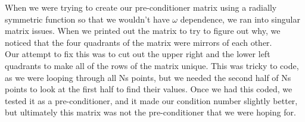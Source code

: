 
When we were trying to create our pre-conditioner matrix using a radially symmetric function so that we wouldn't have $\omega$ dependence, we ran into singular matrix issues. When we printed out the matrix to try to figure out why, we noticed that the four quadrants of the matrix were mirrors of each other. \\
Our attempt to fix this was to cut out the upper right and the lower left quadrants to make all of the rows of the matrix unique. This was tricky to code, as we were looping through all Ns points, but we needed the second half of Ns points to look at the first half to find their values. Once we had this coded, we tested it as a pre-conditioner, and it made our condition number slightly better, but ultimately this matrix was not the pre-conditioner that we were hoping for. 